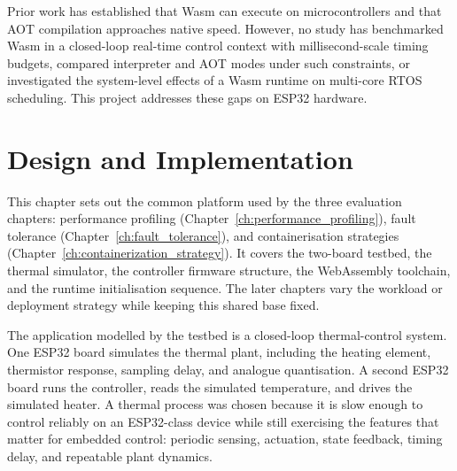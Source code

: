 \documentclass[12pt, a4paper]{report}
\begin{document}

Prior work has established that Wasm can execute on microcontrollers and that AOT compilation
approaches native speed. However, no study has benchmarked Wasm in a closed-loop real-time
control context with millisecond-scale timing budgets, compared interpreter and AOT modes
under such constraints, or investigated the system-level effects of a Wasm runtime on
multi-core RTOS scheduling. This project addresses these gaps on ESP32 hardware.




\chapter{Design and Implementation}
\label{ch:design}

This chapter sets out the common platform used by the three evaluation chapters: performance profiling (Chapter~\ref{ch:performance_profiling}), fault tolerance (Chapter~\ref{ch:fault_tolerance}), and containerisation strategies (Chapter~\ref{ch:containerization_strategy}). It covers the two-board testbed, the thermal simulator, the controller firmware structure, the WebAssembly toolchain, and the runtime initialisation sequence. The later chapters vary the workload or deployment strategy while keeping this shared base fixed.

The application modelled by the testbed is a closed-loop thermal-control system. One ESP32 board simulates the thermal plant, including the heating element, thermistor response, sampling delay, and analogue quantisation. A second ESP32 board runs the controller, reads the simulated temperature, and drives the simulated heater. A thermal process was chosen because it is slow enough to control reliably on an ESP32-class device while still exercising the features that matter for embedded control: periodic sensing, actuation, state feedback, timing delay, and repeatable plant dynamics.
\end{document}
